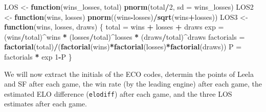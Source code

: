 \documentclass[]{article}
\newenvironment{Shaded}{\begin{snugshade}}{\end{snugshade}}
\newcommand{\ControlFlowTok}[1]{\textcolor[rgb]{0.13,0.29,0.53}{\textbf{#1}}}
\newcommand{\DataTypeTok}[1]{\textcolor[rgb]{0.13,0.29,0.53}{#1}}
\newcommand{\DecValTok}[1]{\textcolor[rgb]{0.00,0.00,0.81}{#1}}
\newcommand{\KeywordTok}[1]{\textcolor[rgb]{0.13,0.29,0.53}{\textbf{#1}}}
\newcommand{\NormalTok}[1]{#1}
\newcommand{\OperatorTok}[1]{\textcolor[rgb]{0.81,0.36,0.00}{\textbf{#1}}}
\newcommand{\StringTok}[1]{\textcolor[rgb]{0.31,0.60,0.02}{#1}}
\begin{document}
\begin{Shaded}
\begin{Highlighting}[]
\NormalTok{LOS <-}\StringTok{ }\ControlFlowTok{function}\NormalTok{(wins_losses, total) }\KeywordTok{pnorm}\NormalTok{(total}\OperatorTok{/}\DecValTok{2}\NormalTok{, }\DataTypeTok{sd =}\NormalTok{ wins_losses)}
\NormalTok{LOS2 <-}\StringTok{ }\ControlFlowTok{function}\NormalTok{(wins, losses) }\KeywordTok{pnorm}\NormalTok{((wins}\OperatorTok{-}\NormalTok{losses)}\OperatorTok{/}\KeywordTok{sqrt}\NormalTok{(wins}\OperatorTok{+}\NormalTok{losses))}
\NormalTok{LOS3 <-}\StringTok{ }\ControlFlowTok{function}\NormalTok{(wins, losses, draws) \{}
\NormalTok{  total =}\StringTok{ }\NormalTok{wins }\OperatorTok{+}\StringTok{ }\NormalTok{losses }\OperatorTok{+}\StringTok{ }\NormalTok{draws}
\NormalTok{  exp =}\StringTok{ }\NormalTok{(wins}\OperatorTok{/}\NormalTok{total)}\OperatorTok{^}\NormalTok{wins }\OperatorTok{*}\StringTok{ }\NormalTok{(losses}\OperatorTok{/}\NormalTok{total)}\OperatorTok{^}\NormalTok{losses }\OperatorTok{*}\StringTok{ }\NormalTok{(draws}\OperatorTok{/}\NormalTok{total)}\OperatorTok{^}\NormalTok{draws}
\NormalTok{  factorials =}\StringTok{ }\KeywordTok{factorial}\NormalTok{(total)}\OperatorTok{/}\NormalTok{(}\KeywordTok{factorial}\NormalTok{(wins)}\OperatorTok{*}\KeywordTok{factorial}\NormalTok{(losses)}\OperatorTok{*}\KeywordTok{factorial}\NormalTok{(draws))}
\NormalTok{  P =}\StringTok{ }\NormalTok{factorials }\OperatorTok{*}\StringTok{ }\NormalTok{exp}
  \DecValTok{1}\OperatorTok{-}\NormalTok{P}
\NormalTok{\}}
\end{Highlighting}
\end{Shaded}

We will now extract the initials of the ECO codes, determin the points
of Leela and SF after each game, the win rate (by the leading engine)
after each game, the estimated ELO difference (\texttt{elodiff}) after
each game, and the three LOS estimates after each game.
\end{document}
